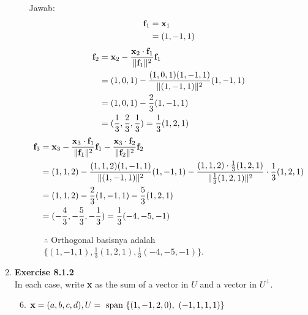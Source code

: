 \documentclass[12pt, a4paper]{scrartcl}
\begin{document}
\begin{enumerate}
\begin{enumerate}
                Jawab:
                \setcounter{equation}{0}
                \begin{align}
                    \notag \textbf{f}_1 &= \textbf{x}_1
                    \\ &= (1, -1, 1)
                \end{align}
                \begin{align}
                    \notag \textbf{f}_2 &= \textbf{x}_2 - \frac{\textbf{x}_2 \cdot \textbf{f}_1}{\Vert \textbf{f}_1 \Vert^2} \textbf{f}_1
                    \\\notag &= (1,0,1) - \frac{(1, 0, 1) (1, -1, 1)}{\Vert(1, -1, 1)\Vert^2} (1, -1, 1)
                    \\\notag &= (1,0,1) - \frac{2}{3} (1, -1, 1)
                    \\ &= (\frac{1}{3}, \frac{2}{3}, \frac{1}{3}) = \frac{1}{3}(1, 2, 1)
                \end{align}
                \begin{align}
                    \notag \textbf{f}_3 &= \textbf{x}_3 - \frac{\textbf{x}_3 \cdot \textbf{f}_1}{\Vert\textbf{f}_1\Vert^2}\textbf{f}_1 - \frac{\textbf{x}_3 \cdot \textbf{f}_2}{\Vert\textbf{f}_2\Vert^2}\textbf{f}_2
                    \\\notag &= (1, 1, 2) - \frac{(1, 1, 2)(1,-1,1)}{\Vert(1, -1, 1)\Vert^2}(1,-1,1) - \frac{(1,1,2)\cdot\frac{1}{3}(1,2,1)}{\Vert\frac{1}{3}(1,2,1)\Vert^2}\cdot\frac{1}{3}(1,2,1)
                    \\\notag &= (1, 1, 2) - \frac{2}{3}(1, -1, 1) - \frac{5}{3}(1,2,1)
                    \\ &= (-\frac{4}{3}, -\frac{5}{3}, -\frac{1}{3}) = \frac{1}{3}(-4,-5,-1)
                \end{align}

                \begin{itemize}
                    \item[$\therefore$] Orthogonal basisnya adalah $\{(1, -1, 1), \frac{1}{3}(1, 2, 1), \frac{1}{3}(-4, -5, -1)\}$.
                \end{itemize}

            \end{enumerate}
            
            \item \textbf{Exercise 8.1.2}\\In each case, write \textbf{x} as the sum of a vector in $U$ and a vector in $U^\perp$.
            \begin{enumerate}
                \setcounter{enumii}{5}
                \item $\textbf{x} = (a, b, c, d),\\U = \mbox{ span } \{(1, -1, 2, 0), \mbox{ }(-1, 1, 1, 1)\}$
                

\end{enumerate}
\end{enumerate}
\end{document}
